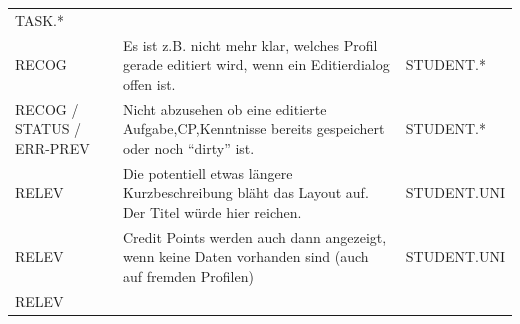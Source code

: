 \documentclass[
  12pt,
  ngerman,
  a4paper,
]{article}
\begin{document}
\begin{longtable}[]{@{}lll@{}}
\begin{minipage}[t]{0.17\columnwidth}
TASK.*\strut
\end{minipage}\tabularnewline
\begin{minipage}[t]{0.22\columnwidth}\raggedright
RECOG\strut
\end{minipage} & \begin{minipage}[t]{0.52\columnwidth}\raggedright
Es ist z.B. nicht mehr klar, welches Profil gerade editiert wird, wenn
ein Editierdialog offen ist.\strut
\end{minipage} & \begin{minipage}[t]{0.17\columnwidth}\raggedright
STUDENT.*\strut
\end{minipage}\tabularnewline
\begin{minipage}[t]{0.22\columnwidth}\raggedright
RECOG / STATUS / ERR-PREV\strut
\end{minipage} & \begin{minipage}[t]{0.52\columnwidth}\raggedright
Nicht abzusehen ob eine editierte Aufgabe,CP,Kenntnisse bereits
gespeichert oder noch ``dirty'' ist.\strut
\end{minipage} & \begin{minipage}[t]{0.17\columnwidth}\raggedright
STUDENT.*\strut
\end{minipage}\tabularnewline
\begin{minipage}[t]{0.22\columnwidth}\raggedright
RELEV\strut
\end{minipage} & \begin{minipage}[t]{0.52\columnwidth}\raggedright
Die potentiell etwas längere Kurzbeschreibung bläht das Layout auf. Der
Titel würde hier reichen.\strut
\end{minipage} & \begin{minipage}[t]{0.17\columnwidth}\raggedright
STUDENT.UNI\strut
\end{minipage}\tabularnewline
\begin{minipage}[t]{0.22\columnwidth}\raggedright
RELEV\strut
\end{minipage} & \begin{minipage}[t]{0.52\columnwidth}\raggedright
Credit Points werden auch dann angezeigt, wenn keine Daten vorhanden
sind (auch auf fremden Profilen)\strut
\end{minipage} & \begin{minipage}[t]{0.17\columnwidth}\raggedright
STUDENT.UNI\strut
\end{minipage}\tabularnewline
\begin{minipage}[t]{0.22\columnwidth}\raggedright
RELEV\strut
\end{minipage} & \begin{minipage}[t]{0.52\columnwidth}\raggedright

\end{minipage}
\end{longtable}
\end{document}

